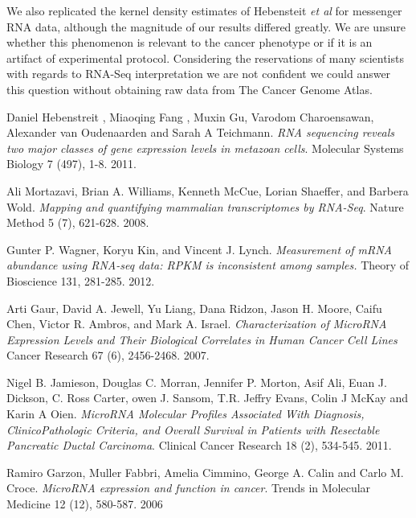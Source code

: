 \documentclass[12pt]{report}
\begin{document}
  We also replicated the kernel density estimates of Hebensteit \textit{et al} for messenger RNA data, although the
  magnitude of our results differed greatly. We are unsure whether this phenomenon is relevant to the cancer phenotype or if it is an artifact of experimental protocol. Considering the reservations of
  many scientists with regards to RNA-Seq interpretation we are not confident we could answer this question without obtaining raw data from The Cancer Genome Atlas.
  
  


\begin{thebibliography}{99}

  Daniel Hebenstreit , Miaoqing Fang , Muxin Gu, Varodom Charoensawan, Alexander van Oudenaarden
and Sarah A Teichmann.
  \emph{RNA sequencing reveals two major classes of gene expression levels in metazoan cells}.
  Molecular Systems Biology 7 (497), 1-8. 2011.

  Ali Mortazavi, Brian A. Williams, Kenneth McCue, Lorian Shaeffer, and Barbera Wold.
  \emph{Mapping and quantifying mammalian transcriptomes by RNA-Seq}.
  Nature Method 5 (7), 621-628. 2008.
  
  Gunter P. Wagner, Koryu Kin, and Vincent J. Lynch.
  \emph{Measurement of mRNA abundance using RNA-seq data: RPKM is inconsistent among samples.}
  Theory of Bioscience 131, 281-285. 2012.

  
  Arti Gaur, David A. Jewell, Yu Liang, Dana Ridzon, Jason H. Moore, Caifu Chen, Victor R. Ambros, and Mark A. Israel.
  \emph{Characterization of MicroRNA Expression Levels and Their Biological Correlates in Human Cancer Cell Lines}
  Cancer Research 67 (6), 2456-2468. 2007.
  
  Nigel B. Jamieson, Douglas C. Morran, Jennifer P. Morton, Asif Ali, Euan J. Dickson, C. Ross Carter, owen J. Sansom,
  T.R. Jeffry Evans, Colin J McKay and Karin A Oien.
  \emph{MicroRNA Molecular Profiles Associated With Diagnosis, ClinicoPathologic Criteria, and Overall Survival in Patients
  with Resectable Pancreatic Ductal Carcinoma}.
  Clinical Cancer Research 18 (2), 534-545. 2011.
  
  Ramiro Garzon, Muller Fabbri, Amelia Cimmino, George A. Calin and Carlo M. Croce.
  \emph{MicroRNA expression and function in cancer}.
  Trends in Molecular Medicine 12 (12), 580-587. 2006
\end{thebibliography}
\end{document}
